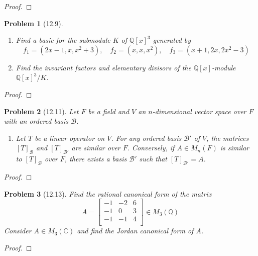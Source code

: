 \documentclass[10pt]{article}
\newcommand{\sk}{\vskip 10mm}
\newcommand{\bb}[1]{\mathbb{#1}}
\theoremstyle{plain}
\newtheorem{problem}{Problem}
\theoremstyle{remark}
\begin{document}
\begin{proof}
  
\end{proof}

\sk

\begin{problem}[12.9]
  \begin{enumerate}
  \item Find a basic for the submodule $K$ of $\bb{Q}[x]^3$ generated by
    \[ f_1=(2x-1,x,x^2+3),\quad f_2=(x,x,x^2),\quad f_3=(x+1,2x,2x^2-3)\]
  \item Find the invariant factors and elementary divisors of the
    $\bb{Q}[x]$-module $\bb{Q}[x]^3/K$.
  \end{enumerate}
\end{problem}

\begin{proof}
  
\end{proof}

\sk

\begin{problem}[12.11]
  Let $F$ be a field and $V$ an $n$-dimensional vector space
  over $F$ with an ordered basis $\mathcal{B}$.
  \begin{enumerate}
  \item Let $T$ be a linear operator on $V$. For any ordered basis
    $\mathcal{B}'$ of $V$, the matrices $[T]_{\mathcal{B}}$ and
    $[T]_{\mathcal{B}'}$ are similar over $F$. Conversely, if
    $A\in M_n(F)$ is similar to $[T]_{\mathcal{B}}$ over $F$, there
    exists a basis $\mathcal{B}'$ such that $[T]_{\mathcal{B}'}=A$.
  \end{enumerate}
\end{problem}

\begin{proof}
  
\end{proof}

\sk

\begin{problem}[12.13]
  Find the rational canonical form of the matrix
  \[
    A = 
    \left[
      \begin{array}{ccc}
        -1&-2&6\\
        -1&0&3\\
        -1&-1&4\\
      \end{array}
    \right] \in M_3(\bb{Q})
  \]
  Consider $A\in M_3(\bb{C})$ and find the Jordan canonical form of $A$.
\end{problem}

\begin{proof}
  
\end{proof}

\sk

\end{document}
